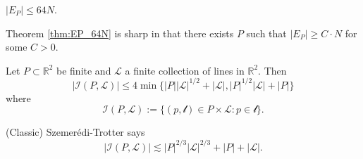     \begin{theorem}
    \label{thm:EP_64N}
    $|E_{P}|\leq 64N$.
    \end{theorem}
    \begin{remark}
        Theorem \ref{thm:EP_64N} is sharp in that there exists $P$ such that $|E_{P}|\geq C\cdot N$ for some $C>0$.
    \end{remark}

    \begin{proposition}
        \label{prop:weak_ST}
        Let $P\subset \mathbb{R}^{2}$ be finite and $\mathscr{L}$ a finite collection of lines in $\mathbb{R}^{2}$. Then
            \begin{equation*}
                |\mathscr{I}(P,\mathscr{L})|\leq 4\min\{ |P| |\mathscr{L}|^{1/2}+|\mathscr{L}|, |P|^{1/2} |\mathscr{L}|+|P|\}
            \end{equation*}
        where
            \begin{equation*}
                \mathscr{I}(P,\mathscr{L}):= \{ (p,\mathscr{l})\in P\times \mathscr{L}: p \in \mathscr{l} \}.
            \end{equation*}
    \end{proposition}
    \begin{remark}
        (Classic) Szemerédi-Trotter says
            \begin{equation*}
                |\mathscr{I}(P,\mathscr{L})|\lesssim |P|^{2/3}|\mathscr{L}|^{2/3}+|P|+|\mathscr{L}|.
            \end{equation*}
    \end{remark}
    
